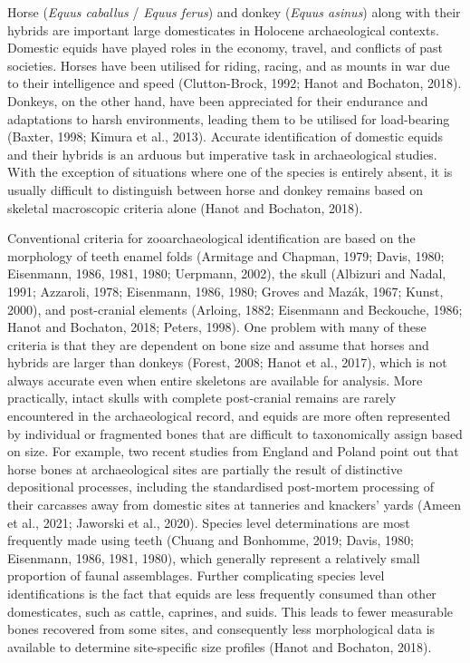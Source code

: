 \documentclass[preprint, 3p, authoryear]{elsarticle} %
\begin{document}
Horse (\emph{Equus caballus} / \emph{Equus ferus}) and donkey (\emph{Equus asinus}) along with their hybrids are important large domesticates in Holocene archaeological contexts. Domestic equids have played roles in the economy, travel, and conflicts of past societies. Horses have been utilised for riding, racing, and as mounts in war due to their intelligence and speed (Clutton-Brock, 1992; Hanot and Bochaton, 2018). Donkeys, on the other hand, have been appreciated for their endurance and adaptations to harsh environments, leading them to be utilised for load-bearing (Baxter, 1998; Kimura et al., 2013). Accurate identification of domestic equids and their hybrids is an arduous but imperative task in archaeological studies. With the exception of situations where one of the species is entirely absent, it is usually difficult to distinguish between horse and donkey remains based on skeletal macroscopic criteria alone (Hanot and Bochaton, 2018).

Conventional criteria for zooarchaeological identification are based on the morphology of teeth enamel folds (Armitage and Chapman, 1979; Davis, 1980; Eisenmann, 1986, 1981, 1980; Uerpmann, 2002), the skull (Albizuri and Nadal, 1991; Azzaroli, 1978; Eisenmann, 1986, 1980; Groves and Mazák, 1967; Kunst, 2000), and post-cranial elements (Arloing, 1882; Eisenmann and Beckouche, 1986; Hanot and Bochaton, 2018; Peters, 1998). One problem with many of these criteria is that they are dependent on bone size and assume that horses and hybrids are larger than donkeys (Forest, 2008; Hanot et al., 2017), which is not always accurate even when entire skeletons are available for analysis. More practically, intact skulls with complete post-cranial remains are rarely encountered in the archaeological record, and equids are more often represented by individual or fragmented bones that are difficult to taxonomically assign based on size. For example, two recent studies from England and Poland point out that horse bones at archaeological sites are partially the result of distinctive depositional processes, including the standardised post-mortem processing of their carcasses away from domestic sites at tanneries and knackers' yards (Ameen et al., 2021; Jaworski et al., 2020). Species level determinations are most frequently made using teeth (Chuang and Bonhomme, 2019; Davis, 1980; Eisenmann, 1986, 1981, 1980), which generally represent a relatively small proportion of faunal assemblages. Further complicating species level identifications is the fact that equids are less frequently consumed than other domesticates, such as cattle, caprines, and suids. This leads to fewer measurable bones recovered from some sites, and consequently less morphological data is available to determine site-specific size profiles (Hanot and Bochaton, 2018).
\end{document}

